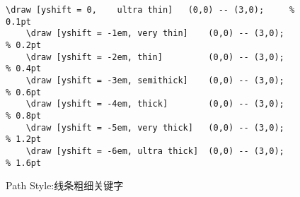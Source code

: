 \begin{itemize}
    \begin{figure}[H]
        \centering
        \begin{minipage}{0.35\linewidth}
            \centering
        \end{minipage}
        \begin{minipage}{0.55\linewidth}
            \begin{lstlisting}[style = latex-side]
    \draw [yshift = 0,    ultra thin]   (0,0) -- (3,0);     % 0.1pt
    \draw [yshift = -1em, very thin]    (0,0) -- (3,0);     % 0.2pt
    \draw [yshift = -2em, thin]         (0,0) -- (3,0);     % 0.4pt
    \draw [yshift = -3em, semithick]    (0,0) -- (3,0);     % 0.6pt
    \draw [yshift = -4em, thick]        (0,0) -- (3,0);     % 0.8pt
    \draw [yshift = -5em, very thick]   (0,0) -- (3,0);     % 1.2pt
    \draw [yshift = -6em, ultra thick]  (0,0) -- (3,0);     % 1.6pt
            \end{lstlisting}
        \end{minipage}
        \caption{Path Style:线条粗细关键字}
    \end{figure}

\end{itemize}

